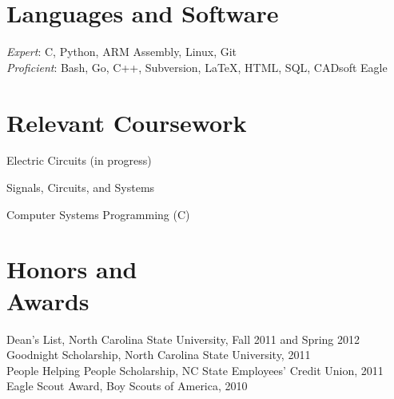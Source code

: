 \documentclass[margin,line,letterpaper]{resume}
\begin{document}
\begin{resume}
    \section{\mysidestyle Languages and Software} 

    \textsl{Expert}: C, Python, ARM Assembly, Linux, Git   \\
    \textsl{Proficient}: Bash, Go, C++, Subversion, \LaTeX, HTML, SQL, CADsoft Eagle


    \section{\mysidestyle Relevant Coursework}

    \begin{list2}
    \item Electric Circuits (in progress)
    \item Signals, Circuits, and Systems
    \item Computer Systems Programming (C)
    \end{list2}\vspace{-1.5mm}


    \section{\mysidestyle Honors and\\Awards} 

    Dean's List, North Carolina State University, Fall 2011 and Spring 2012   \vspace{-8mm}\\%

    Goodnight Scholarship, North Carolina State University, 2011              \vspace{-8mm}\\%

    People Helping People Scholarship, NC State Employees' Credit Union, 2011 \vspace{-8mm}\\%

    Eagle Scout Award, Boy Scouts of America, 2010


\end{resume}
\end{document}
